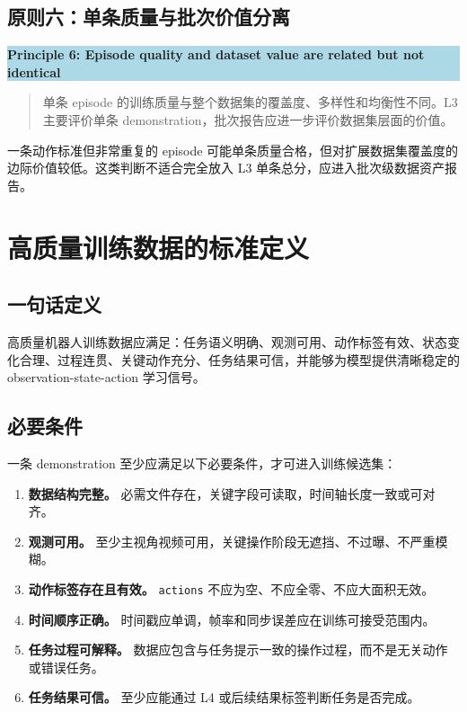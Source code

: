 \documentclass[UTF8,zihao=-4,oneside,openany]{ctexrep}
\newenvironment{principlebox}[1]{\vspace{0.5em}\noindent\colorbox{LightBlue}{\parbox{0.96\linewidth}{\textbf{#1}}}\par\vspace{-0.2em}\begin{quote}\small}{\end{quote}\vspace{0.3em}}
\begin{document}
\subsection{原则六：单条质量与批次价值分离}

\begin{principlebox}{Principle 6: Episode quality and dataset value are related but not identical}
单条 episode 的训练质量与整个数据集的覆盖度、多样性和均衡性不同。L3 主要评价单条 demonstration，批次报告应进一步评价数据集层面的价值。
\end{principlebox}

一条动作标准但非常重复的 episode 可能单条质量合格，但对扩展数据集覆盖度的边际价值较低。这类判断不适合完全放入 L3 单条总分，应进入批次级数据资产报告。

\section{高质量训练数据的标准定义}

\subsection{一句话定义}

高质量机器人训练数据应满足：任务语义明确、观测可用、动作标签有效、状态变化合理、过程连贯、关键动作充分、任务结果可信，并能够为模型提供清晰稳定的 observation-state-action 学习信号。

\subsection{必要条件}

一条 demonstration 至少应满足以下必要条件，才可进入训练候选集：

\begin{enumerate}
  \item \textbf{数据结构完整。} 必需文件存在，关键字段可读取，时间轴长度一致或可对齐。
  \item \textbf{观测可用。} 至少主视角视频可用，关键操作阶段无遮挡、不过曝、不严重模糊。
  \item \textbf{动作标签存在且有效。} \texttt{actions} 不应为空、不应全零、不应大面积无效。
  \item \textbf{时间顺序正确。} 时间戳应单调，帧率和同步误差应在训练可接受范围内。
  \item \textbf{任务过程可解释。} 数据应包含与任务提示一致的操作过程，而不是无关动作或错误任务。
  \item \textbf{任务结果可信。} 至少应能通过 L4 或后续结果标签判断任务是否完成。
\end{enumerate}
\end{document}
